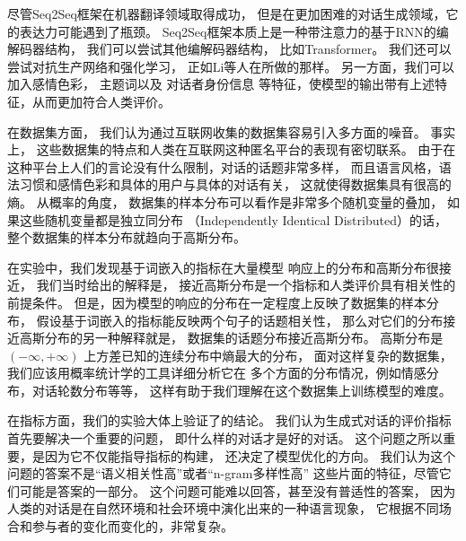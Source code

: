 尽管Seq2Seq框架在机器翻译领域取得成功，
但是在更加困难的对话生成领域，它的表达力可能遇到了瓶颈。
Seq2Seq框架本质上是一种带注意力的基于RNN的编解码器结构，
我们可以尝试其他编解码器结构，
比如Transformer。
我们还可以尝试对抗生产网络和强化学习，
正如Li等人在所做的那样。
另一方面，我们可以加入感情色彩，
主题词以及
对话者身份信息
等特征，使模型的输出带有上述特征，从而更加符合人类评价。

在数据集方面，
我们认为通过互联网收集的数据集容易引入多方面的噪音。
事实上，
这些数据集的特点和人类在互联网这种匿名平台的表现有密切联系。
由于在这种平台上人们的言论没有什么限制，对话的话题非常多样，
而且语言风格，语法习惯和感情色彩和具体的用户与具体的对话有关，
这就使得数据集具有很高的熵。
从概率的角度，
数据集的样本分布可以看作是非常多个随机变量的叠加，
如果这些随机变量都是独立同分布
（Independently Identical Distributed）的话，
整个数据集的样本分布就趋向于高斯分布。

在实验中，我们发现基于词嵌入的指标在大量模型
响应上的分布和高斯分布很接近，
我们当时给出的解释是，
接近高斯分布是一个指标和人类评价具有相关性的前提条件。
但是，因为模型的响应的分布在一定程度上反映了数据集的样本分布，
假设基于词嵌入的指标能反映两个句子的话题相关性，
那么对它们的分布接近高斯分布的另一种解释就是，
数据集的话题分布接近高斯分布。
高斯分布是$(-\infty, +\infty)$
上方差已知的连续分布中熵最大的分布，
面对这样复杂的数据集，我们应该用概率统计学的工具详细分析它在
多个方面的分布情况，例如情感分布，对话轮数分布等等，
这样有助于我们理解在这个数据集上训练模型的难度。

在指标方面，我们的实验大体上验证了的结论。
我们认为生成式对话的评价指标首先要解决一个重要的问题，
即什么样的对话才是好的对话。
这个问题之所以重要，是因为它不仅能指导指标的构建，
还决定了模型优化的方向。
我们认为这个问题的答案不是“语义相关性高”或者“n-gram多样性高”
这些片面的特征，尽管它们可能是答案的一部分。
这个问题可能难以回答，甚至没有普适性的答案，
因为人类的对话是在自然环境和社会环境中演化出来的一种语言现象，
它根据不同场合和参与者的变化而变化的，非常复杂。

